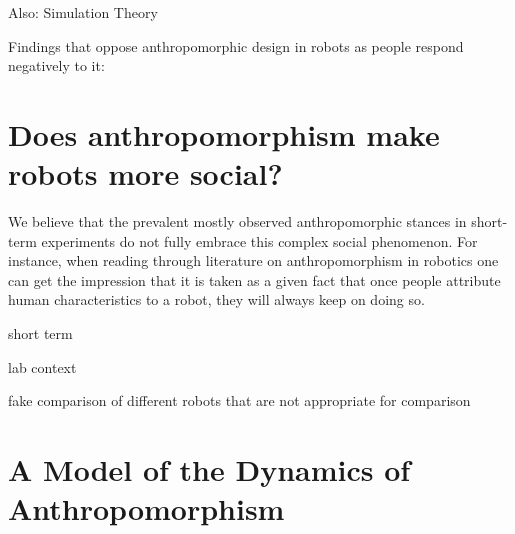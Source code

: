 \documentclass[twocolumn]{svjour3}          %
\begin{document}
	Also: Simulation Theory

	Findings that oppose anthropomorphic design in robots as people respond negatively to it:
	
	
%
%
%
%
%
%

\section{Does anthropomorphism make robots more social?}
\label{sec:6}

We believe that the prevalent mostly observed anthropomorphic stances in short-term experiments do not fully embrace this complex social phenomenon. For instance, when reading through literature on anthropomorphism in robotics one can get the impression that it is taken as a given fact that once people attribute human characteristics to a robot, they will always keep on doing so.
	
	short term
	
	lab context
	
	fake comparison of different robots that are not appropriate for comparison	
	
	
%
%
%
%
%
%

\section{A Model of the Dynamics of Anthropomorphism}
\label{sec:dynamics_model}
\end{document}

